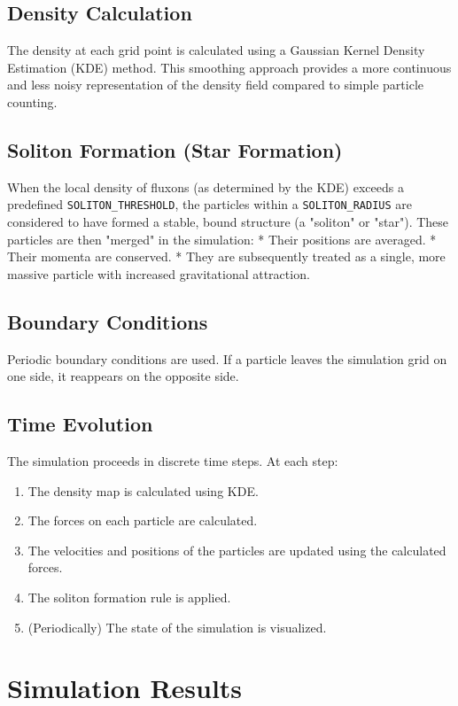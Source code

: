 \documentclass[11pt]{article}
\begin{document}
\subsection{Density Calculation}
The density at each grid point is calculated using a Gaussian Kernel Density Estimation (KDE) method. This smoothing approach provides a more continuous and less noisy representation of the density field compared to simple particle counting.

\subsection{Soliton Formation (Star Formation)}
When the local density of fluxons (as determined by the KDE) exceeds a predefined \texttt{SOLITON\_THRESHOLD}, the particles within a \texttt{SOLITON\_RADIUS} are considered to have formed a stable, bound structure (a "soliton" or "star").  These particles are then "merged" in the simulation:
    *   Their positions are averaged.
    *   Their momenta are conserved.
    *   They are subsequently treated as a single, more massive particle with increased gravitational attraction.

\subsection{Boundary Conditions}
Periodic boundary conditions are used.  If a particle leaves the simulation grid on one side, it reappears on the opposite side.

\subsection{Time Evolution}
The simulation proceeds in discrete time steps.  At each step:

\begin{enumerate}
    \item The density map is calculated using KDE.
    \item The forces on each particle are calculated.
    \item The velocities and positions of the particles are updated using the calculated forces.
    \item The soliton formation rule is applied.
    \item (Periodically) The state of the simulation is visualized.
\end{enumerate}

\section{Simulation Results}
\end{document}
